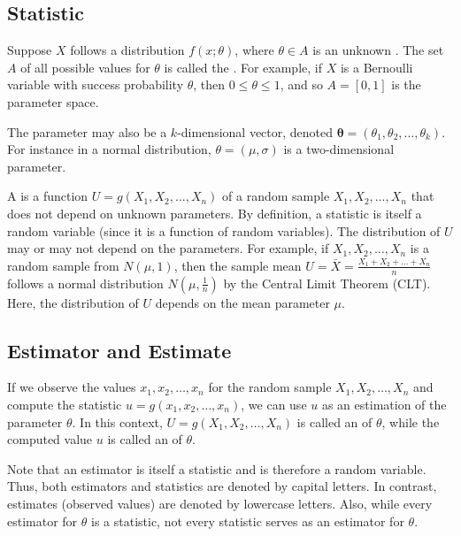 \subsection{Statistic}

Suppose \( X \) follows a distribution \( f(x; \theta) \), where \( \theta \in A \) is an unknown .
The set \( A \) of all possible values for \( \theta \) is called the .
For example, if \( X \) is a Bernoulli variable with success probability \( \theta \),
then \( 0 \leq \theta \leq 1 \), and so \( A = [0, 1] \) is the parameter space.


The parameter may also be a \( k \)-dimensional vector, denoted \( \bm{\theta} = (\theta_1, \theta_2, \ldots, \theta_k) \).
For instance in a normal distribution, \( \theta = (\mu, \sigma) \) is a two-dimensional parameter.

A  is a function \( U = g(X_1, X_2, \ldots, X_n) \) of a random sample \( X_1, X_2, \ldots, X_n \) that does not depend on unknown parameters.
By definition, a statistic is itself a random variable (since it is a function of random variables).
The distribution of \( U \) may or may not depend on the parameters.
For example, if \( X_1, X_2, \ldots, X_n \) is a random sample from \( N(\mu, 1) \),
then the sample mean \( U = \bar{X} = \frac{X_1 + X_2 + \ldots + X_n}{n} \) follows a normal distribution \( N(\mu, \frac{1}{n}) \) by the Central Limit Theorem (CLT).
Here, the distribution of \( U \) depends on the mean parameter \( \mu \).

\subsection{Estimator and Estimate}

If we observe the values \( x_1, x_2, \ldots, x_n \) for the random sample \( X_1, X_2, \ldots, X_n \)
and compute the statistic \( u = g(x_1, x_2, \ldots, x_n) \),
we can use \( u \) as an estimation of the parameter \( \theta \).
In this context, \( U = g(X_1, X_2, \ldots, X_n) \) is called an  of \( \theta \),
while the computed value \( u \) is called an  of \( \theta \).

Note that an estimator is itself a statistic and is therefore a random variable.
Thus, both estimators and statistics are denoted by capital letters.
In contrast, estimates (observed values) are denoted by lowercase letters.
Also, while every estimator for \( \theta \) is a statistic,
not every statistic serves as an estimator for \( \theta \).


